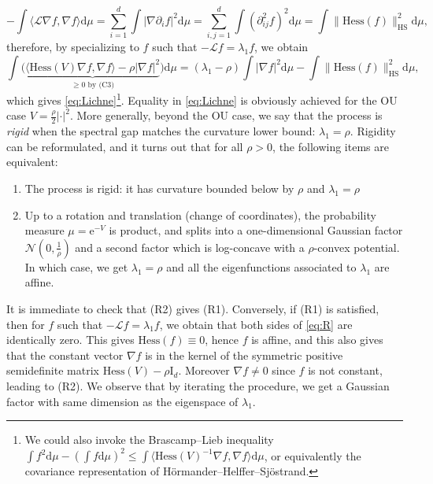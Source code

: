 \documentclass[10pt,reqno]{amsart}
\numberwithin{equation}{section}
\begin{document}
\begin{equation}
  -\int\langle\mathcal{L}\nabla f,\nabla f\rangle\mathrm{d}\mu
  =\sum_{i=1}^d\int|\nabla\partial_if|^2\mathrm{d}\mu
  =\sum_{i,j=1}^d\int(\partial^2_{ij}f)^2\mathrm{d}\mu
  =\int\|\mathrm{Hess}(f)\|_{\mathrm{HS}}^2\mathrm{d}\mu,
\end{equation}
therefore, by specializing to $f$ such that $-\mathcal{L} f=\lambda_1f$, we obtain
\begin{equation}\label{eq:R}
  \int\bigl(\underbrace{\langle\mathrm{Hess}(V)\nabla f,\nabla f\rangle-\rho|\nabla f|^2}_{\geq0\text{ by (C3)}}\bigr)
  \mathrm{d}\mu
  =(\lambda_1-\rho)\int|\nabla f|^2\mathrm{d}\mu
  -\int\|\mathrm{Hess}(f)\|_{\mathrm{HS}}^2\mathrm{d}\mu,
\end{equation}
which gives \eqref{eq:Lichne}\footnote{We could also invoke the
  Brascamp--Lieb inequality
  $\int f^2\mathrm{d}\mu-(\int
  f\mathrm{d}\mu)^2\leq\int\langle\mathrm{Hess}(V)^{-1}\nabla f,\nabla
  f\rangle\mathrm{d}\mu$, or equivalently the covariance representation of
  Hörmander--Helffer--Sjöstrand.}. Equality in \eqref{eq:Lichne} is
obviously achieved for the OU case $V=\frac{\rho}{2}\left|\cdot\right|^2$.
More generally, beyond the OU case, we say that the process is \emph{rigid}
when the spectral gap matches the curvature lower bound: $\lambda_1=\rho$.
Rigidity can be reformulated, and it turns out that for all $\rho>0$, the
following items are equivalent:
\begin{enumerate}[label=(R\arabic*)]
\item The process is rigid: it has curvature bounded below by $\rho$ and $\lambda_1=\rho$
\item Up to a rotation and translation (change of coordinates), the
  probability measure $\mu=\mathrm{e}^{-V}$ is product, and splits into
  a one-dimensional Gaussian factor $\mathcal{N}(0,\frac{1}{\rho})$ and a
  second factor which is log-concave with a $\rho$-convex potential. In which
  case, we get $\lambda_1=\rho$ and all the eigenfunctions associated to
  $\lambda_1$ are affine.
\end{enumerate}
It is immediate to check that (R2) gives (R1). Conversely, if (R1) is
satisfied, then for $f$ such that $-\mathcal{L} f=\lambda_1f$, we obtain that both
sides of \eqref{eq:R} are identically zero. This gives
$\mathrm{Hess}(f)\equiv0$, hence $f$ is affine, and this also gives that the
constant vector $\nabla f$ is in the kernel of the symmetric positive
semidefinite matrix $\mathrm{Hess}(V)-\rho\mathrm{I}_d$. Moreover
$\nabla f\neq0$ since $f$ is not constant, leading to (R2). We observe that by
iterating the procedure, we get a Gaussian factor with same dimension as the
eigenspace of $\lambda_1$.
\end{document}
